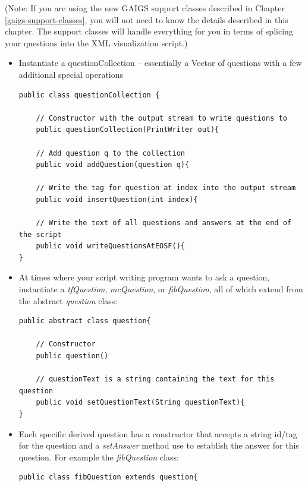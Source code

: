 \documentclass[11pt,letterpaper]{book}
\begin{document}
(Note: If you are using the new GAIGS support classes described in Chapter
\ref{gaigs-support-classes}, you will not need to know the details
described in this chapter.  The support classes will handle everything
for you in terms of splicing your questions into the XML visualization
script.)

\begin{itemize}
\item Instantiate a questionCollection -- essentially a Vector of questions with a few additional special operations

\small
\begin{verbatim}
public class questionCollection {
    
    // Constructor with the output stream to write questions to
    public questionCollection(PrintWriter out){

    // Add question q to the collection
    public void addQuestion(question q){

    // Write the tag for question at index into the output stream
    public void insertQuestion(int index){

    // Write the text of all questions and answers at the end of the script
    public void writeQuestionsAtEOSF(){
}
\end{verbatim}

\normalsize  
\item At times where your script writing program wants to ask a
  question, instantiate a \textit{tfQuestion}, \textit{mcQuestion}, or
  \textit{fibQuestion}, all of which extend from the abstract
  \textit{question} class:

\small
\begin{verbatim}
public abstract class question{
    
    // Constructor 
    public question()

    // questionText is a string containing the text for this question
    public void setQuestionText(String questionText){
}
\end{verbatim}
  
\normalsize
\item Each specific derived question has a constructor that accepts a
  string id/tag for the question and a \textit{setAnswer} method use
  to establish the answer for this question.  For example the
  \textit{fibQuestion} class:

\small
\begin{verbatim}
public class fibQuestion extends question{
    

\end{verbatim}
\end{itemize}
\end{document}
